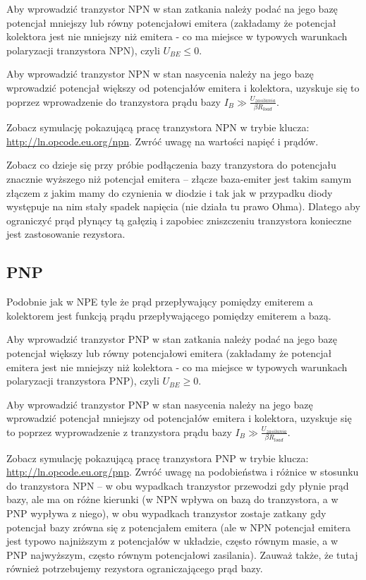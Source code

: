 Aby wprowadzić tranzystor NPN w stan zatkania należy podać na jego bazę potencjał mniejszy lub równy potencjałowi emitera (zakładamy że potencjał kolektora jest nie mniejszy niż emitera - co ma miejsce w typowych warunkach polaryzacji tranzystora NPN), czyli $U_{BE} \leq 0$.

Aby wprowadzić tranzystor NPN w stan nasycenia należy na jego bazę wprowadzić potencjał większy od potencjałów emitera i kolektora, uzyskuje się to poprzez wprowadzenie do tranzystora prądu bazy $I_B \gg \frac{U_{zasilania}}{\beta R_{load}}$.

Zobacz symulację pokazującą pracę tranzystora NPN w trybie klucza: \url{http://ln.opcode.eu.org/npn}.
Zwróć uwagę na wartości napięć i prądów.

Zobacz co dzieje się przy próbie podłączenia bazy tranzystora do potencjału znacznie wyższego niż potencjał emitera – złącze baza-emiter jest takim samym złączem z jakim mamy do czynienia w diodzie i tak jak w przypadku diody występuje na nim stały spadek napięcia (nie działa tu prawo Ohma). Dlatego aby ograniczyć prąd płynący tą gałęzią i zapobiec zniszczeniu tranzystora konieczne jest zastosowanie rezystora.

\subsection{PNP}
Podobnie jak w NPE tyle że prąd przepływający pomiędzy emiterem a kolektorem jest funkcją prądu przepływającego pomiędzy emiterem a bazą.

Aby wprowadzić tranzystor PNP w stan zatkania należy podać na jego bazę potencjał większy lub równy potencjałowi emitera (zakładamy że potencjał emitera jest nie mniejszy niż kolektora - co ma miejsce w typowych warunkach polaryzacji tranzystora PNP), czyli $U_{BE} \geq 0$.

Aby wprowadzić tranzystor PNP w stan nasycenia należy na jego bazę wprowadzić potencjał mniejszy od potencjałów emitera i kolektora, uzyskuje się to poprzez wyprowadzenie z tranzystora prądu bazy $I_B \gg \frac{U_{zasilania}}{\beta R_{load}}$.

Zobacz symulację pokazującą pracę tranzystora PNP w trybie klucza: \url{http://ln.opcode.eu.org/pnp}.
Zwróć uwagę na podobieństwa i różnice w stosunku do tranzystora NPN –
	w obu wypadkach tranzystor przewodzi gdy płynie prąd bazy, ale ma on różne kierunki (w NPN wpływa on bazą do tranzystora, a w PNP wypływa z niego),
	w obu wypadkach tranzystor zostaje zatkany gdy potencjał bazy zrówna się z potencjałem emitera (ale w NPN potencjał emitera jest typowo najniższym z potencjałów w układzie, często równym masie, a w PNP najwyższym, często równym potencjałowi zasilania).
Zauważ także, że tutaj również potrzebujemy rezystora ograniczającego prąd bazy.

